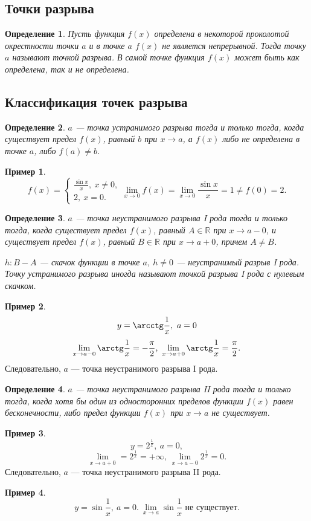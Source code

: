 \documentclass[a4paper,12pt]{article} %
\newtheorem{definition}{Определение}[section]
\theoremstyle{remark}
\theoremstyle{definition}
\newtheorem{exmp}{Пример}[section]
\begin{document}
\subsection{Точки разрыва}
\begin{definition}
	Пусть функция $f(x)$ определена в некоторой проколотой окрестности точки $a$ и в точке $a$ $f(x)$ не является непрерывной. Тогда точку $a$ называют точкой разрыва. В самой точке функция $f(x)$ может быть как определена, так и не определена.
\end{definition}

\subsection{Классификация точек разрыва}
\begin{definition}
	$a$ --- точка устранимого разрыва тогда и только тогда, когда существует предел $f(x)$, равный $b$ при $x \to a$, а $f(x)$ либо не определена в точке $a$, либо $f(a)\neq b$.	
\end{definition}
\begin{exmp}
	\[
	f(x) = \begin{cases}
		\frac{\sin x}{x}, \ x \neq 0, \\
		2, \ x = 0.
	\end{cases}
	\lim_{x \to 0} f(x) = \lim_{x \to 0} \frac{\sin x}{x} = 1 \neq f(0) = 2
	.\] 
\end{exmp}

\begin{definition}
	$a$ --- точка неустранимого разрыва I рода тогда и только тогда, когда существует предел $f(x)$, равный $A \in \mathbb{R}$ при $x\to a-0$, и существует предел $f(x)$, равный $B\in \mathbb{R}$ при $x\to a+0$, причем $A\neq B$.	

    $h : B-A$ --- скачок функции в точке $a$, $h\neq 0$ --- неустранимый разрыв I рода. Точку устранимого разрыва иногда называют точкой разрыва I рода с нулевым скачком.
\end{definition}
\begin{exmp}
    \[ y = \arcctg \frac{1}{x}, \ a = 0 \] 
    \[ \lim_{x \to a-0} \arctg \frac{1}{x} = - \frac{\pi}{2}, \ \lim_{x \to a+0} \arctg \frac{1}{x} = \frac{\pi}{2} .\] 
    Следовательно, $a$ --- точка неустранимого разрыва I рода.
\end{exmp}

\begin{definition}
    $a$ --- точка неустранимого разрыва II рода тогда и только тогда, когда хотя бы один из односторонних пределов функции $f(x)$ равен бесконечности, либо предел функции $f(x)$ при $x\to a$ не существует.
\end{definition}
\begin{exmp}
    \[ y = 2^{\frac{1}{x}}, \ a = 0,\] 
    \[\lim_{x \to a + 0} = 2^{\frac{1}{x}} = +\infty, \ \lim_{x \to a-0} 2^{\frac{1}{x}} = 0.\] 
    Следовательно, $a$ --- точка неустранимого разрыва II рода.
\end{exmp}
\begin{exmp}
    \[y = \sin \frac{1}{x}, \ a = 0. \ \lim_{x \to a} \sin \frac{1}{x} \text{ не существует}.\] 
\end{exmp}
\end{document}
